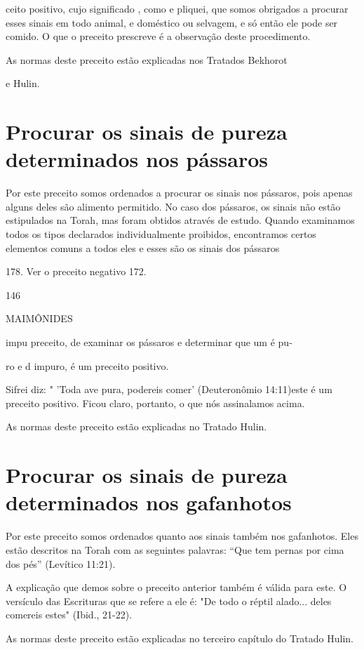 ceito positivo, cujo significado , como e pliquei, que somos obrigados a
pro­curar esses sinais em todo animal, e doméstico ou selvagem, e só
então ele pode ser comido. O que o preceito prescreve é a observação
deste pro­cedimento.


As normas deste preceito estão explicadas nos Tratados Bekhorot


e Hulin.

\section{Procurar os sinais de pureza determinados nos pássaros}

Por este preceito somos ordenados a procurar os sinais nos pássa­ros,
pois apenas alguns deles são alimento permitido. No caso dos pássaros,
os sinais não estão estipulados na Torah, mas foram obtidos através de
estudo. Quan­do examinamos todos os tipos declarados individualmente
proibidos, encon­tramos certos elementos comuns a todos eles e esses são
os sinais dos pássaros

178. Ver o preceito negativo 172.


146

MAIMÔNIDES


impu preceito, de examinar os pássaros e determinar que um é pu-

ro e d impuro, é um preceito positivo.

Sifrei diz: " 'Toda ave pura, podereis comer' (Deuteronômio 14:11)este é
um preceito positivo. Ficou claro, portanto, o que nós assinala­mos
acima.

As normas deste preceito estão explicadas no Tratado Hulin.

\section{Procurar os sinais de pureza determinados nos gafanhotos}

Por este preceito somos ordenados quanto aos sinais também nos
gafanhotos. Eles estão descritos na Torah com as seguintes palavras:
``Que tem pernas por cima dos pés'' (Levítico 11:21).

A explicação que demos sobre o preceito anterior também é válida para
este. O versículo das Escrituras que se refere a ele é: "De todo o
réptil alado... deles comereis estes" (Ibid., 21-22).

As normas deste preceito estão explicadas no terceiro capítulo do
Tratado Hulin.



